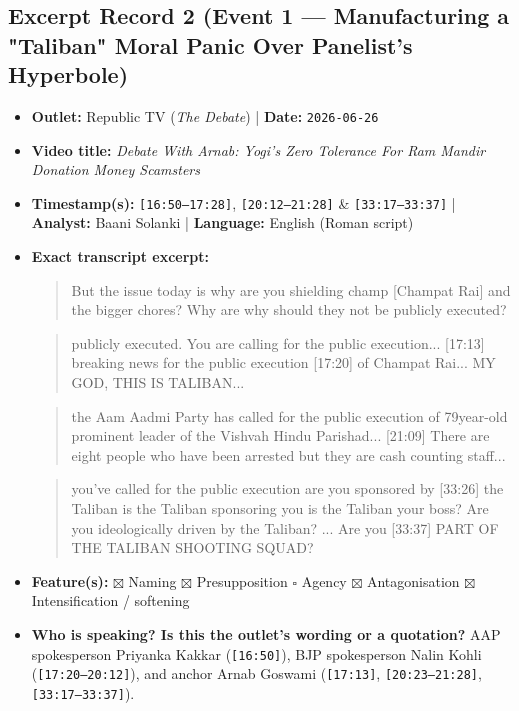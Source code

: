 \documentclass[10pt,a4paper]{article}
\begin{document}
\subsection*{Excerpt Record 2 (Event 1 --- Manufacturing a "Taliban" Moral Panic Over Panelist's Hyperbole)}
\begin{itemize}[leftmargin=1.5em, itemsep=3pt, topsep=4pt]
  \item \textbf{Outlet:} Republic TV (\textit{The Debate}) | \textbf{Date:} \texttt{2026-06-26}
  \item \textbf{Video title:} \textit{Debate With Arnab: Yogi's Zero Tolerance For Ram Mandir Donation Money Scamsters}
  \item \textbf{Timestamp(s):} \texttt{[16:50--17:28]}, \texttt{[20:12--21:28]} \& \texttt{[33:17--33:37]} | \textbf{Analyst:} Baani Solanki | \textbf{Language:} English (Roman script)
  \item \textbf{Exact transcript excerpt:}
    \begin{quote}\small{} But the issue today is why are you shielding champ [Champat Rai] and the bigger chores? Why are why should they not be publicly executed?\end{quote}
    \begin{quote}\small{} publicly executed. You are calling for the public execution... [17:13] breaking news for the public execution [17:20] of Champat Rai... MY GOD, THIS IS TALIBAN...\end{quote}
    \begin{quote}\small{} the Aam Aadmi Party has called for the public execution of 79year-old prominent leader of the Vishvah Hindu Parishad... [21:09] There are eight people who have been arrested but they are cash counting staff...\end{quote}
    \begin{quote}\small{} you've called for the public execution are you sponsored by [33:26] the Taliban is the Taliban sponsoring you is the Taliban your boss? Are you ideologically driven by the Taliban? ... Are you [33:37] PART OF THE TALIBAN SHOOTING SQUAD?\end{quote}
  \item \textbf{Feature(s):} $\boxtimes$ Naming $\boxtimes$ Presupposition $\square$ Agency $\boxtimes$ Antagonisation $\boxtimes$ Intensification / softening
  \item \textbf{Who is speaking? Is this the outlet's wording or a quotation?} AAP spokesperson Priyanka Kakkar (\texttt{[16:50]}), BJP spokesperson Nalin Kohli (\texttt{[17:20--20:12]}), and anchor Arnab Goswami (\texttt{[17:13]}, \texttt{[20:23--21:28]}, \texttt{[33:17--33:37]}).

\end{itemize}
\end{document}

